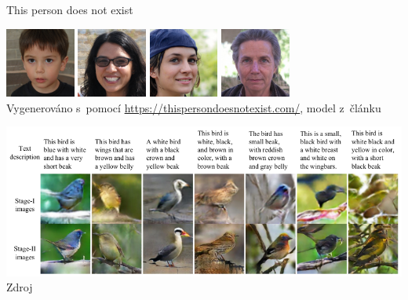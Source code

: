 \documentclass[aspectratio=169,dvipsnames]{beamer}
\begin{document}

\begin{frame}{This person does not exist}

    \centering
    \includegraphics[width=65pt]{img/person1.jpeg}
    \includegraphics[width=65pt]{img/person2.jpeg}
    \includegraphics[width=65pt]{img/person3.jpeg}
    \includegraphics[width=65pt]{img/person4.jpeg} \\
    {\tiny Vygenerováno s~pomocí \url{https://thispersondoesnotexist.com/},
    model z~článku \citet{karras2020analyzing}}

    \includegraphics[scale=.35]{img/gan_birds.png} \\
    {\tiny Zdroj \citet[obr.\ 5]{zhang2017stack}}

\end{frame}

\end{document}
